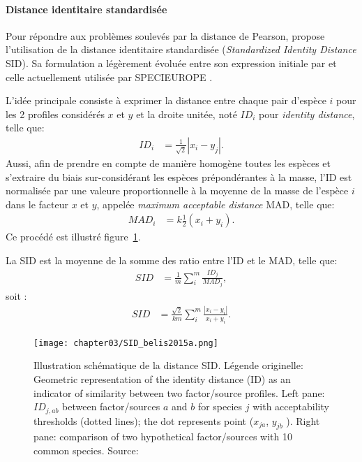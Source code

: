 \paragraph{Distance identitaire standardisée}%
\label{par:distance_identitaire_standardisée}

Pour répondre aux problèmes soulevés par la distance de Pearson, \textcite{belisNew2015}
propose l'utilisation de la distance identitaire standardisée (\textit{Standardized
Identity Distance} SID). Sa formulation a légèrement évoluée entre son expression
initiale par \textcite{belisNew2015} et celle actuellement utilisée par SPECIEUROPE
\autocite{pernigottiSPECIEUROPE2016,pernigottiDeltaSA2018}.

L'idée principale consiste à exprimer la distance entre chaque pair d'espèce $i$ pour les 2
profiles considérés $x$ et $y$ et la droite unitée, noté $ID_i$ pour \textit{identity
distance}, telle que:
\begin{align}
    \label{eq:IDi}
    ID_i &= \frac{1}{\sqrt{2}}|x_i - y_j|.
\end{align}
Aussi, afin de prendre en compte de manière homogène toutes les espèces et s'extraire du
biais sur-considérant les espèces prépondérantes à la masse, l'ID est normalisée par une
valeure proportionnelle à la moyenne de la masse de l'espèce $i$ dans le facteur $x$ et
$y$, appelée \textit{maximum acceptable distance} MAD, telle que:
\begin{align}
    \label{eq:MAD}
    MAD_i &= k \frac{1}{2}(x_i + y_i).
\end{align}
Ce procédé est illustré figure~\ref{fig:chapter03/SID_belis2015a}.

La SID est la moyenne de la somme des ratio entre l'ID et le MAD, telle que:
\begin{align}
    \label{eq:SIDi}
    SID &= \frac{1}{m}\sum_i^m\frac{ID_j}{MAD_j},
\end{align}
soit :
\begin{align}
    \label{eq:SID}
    SID &= \frac{\sqrt{2}}{km} \sum_i^m \frac{|x_i - y_i|}{x_i + y_i}.
\end{align}

\begin{figure}[ht]
    \centering
    \texttt{[image: chapter03/SID\_belis2015a.png]}
    \caption{Illustration schématique de la distance SID. Légende originelle:
        Geometric representation of the identity distance (ID) as an indicator of
        similarity between two factor/source profiles. Left pane: $ID_{j,ab}$ between
        factor/sources $a$ and $b$ for species $j$ with acceptability thresholds (dotted lines);
        the dot represents point ($x_{ja}$, $y_{jb}$ ). Right pane: comparison of two
        hypothetical factor/sources with 10 common species.
        Source: \cite[figure 2]{belisNew2015}
}%
    \label{fig:chapter03/SID_belis2015a}
\end{figure}

